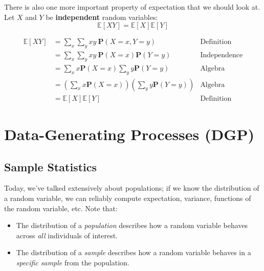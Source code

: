 \documentclass[
  letterpaper,
  DIV=11,
  numbers=noendperiod]{scrreprt}
\providecommand{\tightlist}{%
  \setlength{\itemsep}{0pt}\setlength{\parskip}{0pt}}\usepackage{longtable,booktabs,array}
\begin{document}
There is also one more important property of expectation that we should
look at. Let \(X\) and \(Y\) be \textbf{independent} random variables:
\[ \mathbb{E}[XY] = \mathbb{E}[X]\mathbb{E}[Y] \]

\begin{tcolorbox}[enhanced jigsaw, arc=.35mm, left=2mm, toprule=.15mm, leftrule=.75mm, bottomrule=.15mm, colframe=quarto-callout-tip-color-frame, rightrule=.15mm, colbacktitle=quarto-callout-tip-color!10!white, opacitybacktitle=0.6, coltitle=black, bottomtitle=1mm, colback=white, toptitle=1mm, title=\textcolor{quarto-callout-tip-color}{\faLightbulb}\hspace{0.5em}{Proof}, breakable, opacityback=0, titlerule=0mm]

\[\begin{align}
   \mathbb{E}[XY] &= \sum_x\sum_y xy\ \textbf{P}(X=x, Y=y) &\text{Definition} \\
   &= \sum_x\sum_y xy\ \textbf{P}(X=x)\textbf{P}(Y=y) &\text{Independence}\\
   &= \sum_x x\textbf{P}(X=x) \sum_y y \textbf{P}(Y=y) &\text{Algebra}\\
   &= \left(\sum_x x\textbf{P}(X=x)\right) \left(\sum_y y \textbf{P}(Y=y)\right) &\text{Algebra}\\
   &= \mathbb{E}[X]\mathbb{E}[Y] &\text{Definition}
\end{align}\]

\end{tcolorbox}

\section{Data-Generating Processes
(DGP)}\label{data-generating-processes-dgp}

\subsection{Sample Statistics}\label{sample-statistics}

Today, we've talked extensively about populations; if we know the
distribution of a random variable, we can reliably compute expectation,
variance, functions of the random variable, etc. Note that:

\begin{itemize}
\tightlist
\item
  The distribution of a \emph{population} describes how a random
  variable behaves across \emph{all} individuals of interest.
\item
  The distribution of a \emph{sample} describes how a random variable
  behaves in a \emph{specific sample} from the population.
\end{itemize}
\end{document}

